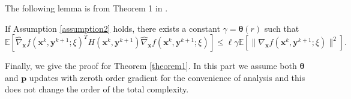 The following lemma is from Theorem 1 in \cite{MalladiGNDL0A23Mezo}.

\begin{lemma}
\label{lemma9}
If Assumption \ref{assumption2} holds, there exists a constant $\gamma={ \bm{\theta}}(r)$ such that 
$$\mathbb{E}[\hat{\nabla}_{ \mathbf{x}} f({ \mathbf{x}}^k,{ \mathbf{y}}^{k+1};\xi)^T H({ \mathbf{x}}^k,{ \mathbf{y}}^{k+1})\hat{\nabla}_{ \mathbf{x}} f({ \mathbf{x}}^k,{ \mathbf{y}}^{k+1};\xi)]\leq \ell\gamma \mathbb{E}[\|\nabla_{ \mathbf{x}} f({ \mathbf{x}}^k,{ \mathbf{y}}^{k+1};\xi)\|^2].$$
\end{lemma}

Finally, we give the proof for Theorem \ref{theorem1}. In this part we assume both ${ \bm{\theta}}$ and ${ \mathbf{p}}$ updates with zeroth order gradient for the convenience of analysis and this does not change the order of the total complexity.

